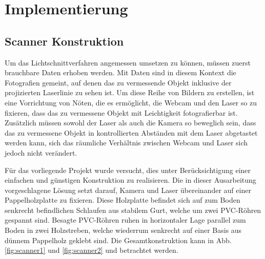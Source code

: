 \chapter{Implementierung}

\section{Scanner Konstruktion}
\label{sec:scannerKonstruktion}
Um das Lichtschnittverfahren angemessen umsetzen zu können, müssen zuerst brauchbare Daten erhoben werden. Mit Daten sind in diesem Kontext die Fotografien gemeint, auf denen das zu vermessende Objekt inklusive der projizierten Laserlinie zu sehen ist. Um diese Reihe von Bildern zu erstellen, ist eine Vorrichtung von Nöten, die es ermöglicht, die Webcam und den Laser so zu fixieren, dass das zu vermessene Objekt mit Leichtigkeit fotografierbar ist. Zusätzlich müssen sowohl der Laser als auch die Kamera so beweglich sein, dass das zu vermessene Objekt in kontrollierten Abständen mit dem Laser abgetastet werden kann, sich das räumliche Verhältnis zwischen Webcam und Laser sich jedoch nicht verändert. 

Für das vorliegende Projekt wurde versucht, dies unter Berücksichtigung einer einfachen und günstigen Konstruktion zu realisieren. Die in dieser Ausarbeitung vorgeschlagene Lösung setzt darauf, Kamera und Laser übereinander auf einer Pappelholzplatte zu fixieren. Diese Holzplatte befindet sich auf zum Boden senkrecht befindlichen Schlaufen aus stabilem Gurt, welche um zwei PVC-Röhren gespannt sind. Besagte PVC-Röhren ruhen in horizontaler Lage parallel zum Boden in zwei Holzstreben, welche wiederrum senkrecht auf einer Basis aus dünnem Pappelholz geklebt sind. Die Gesamtkonstruktion kann in Abb. \ref{fig:scanner1} und \ref{fig:scanner2} und betrachtet werden.

